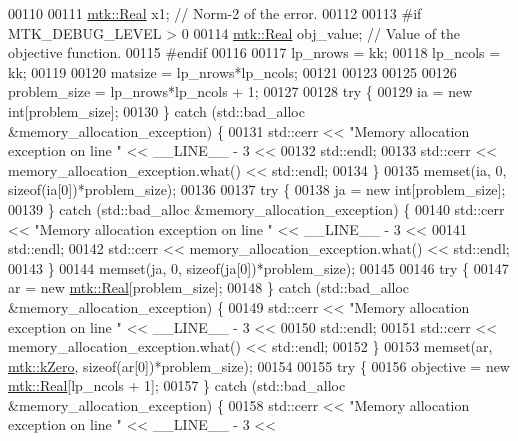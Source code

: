 \begin{DoxyCode}
00110 
00111   \hyperlink{group__c01-roots_gac080bbbf5cbb5502c9f00405f894857d}{mtk::Real} x1;             \textcolor{comment}{// Norm-2 of the error.}
00112 
00113 \textcolor{preprocessor}{  #if MTK\_DEBUG\_LEVEL > 0}
00114   \hyperlink{group__c01-roots_gac080bbbf5cbb5502c9f00405f894857d}{mtk::Real} obj\_value;      \textcolor{comment}{// Value of the objective function.}
00115 \textcolor{preprocessor}{  #endif}
00116 
00117   lp\_nrows = kk;
00118   lp\_ncols = kk;
00119 
00120   matsize = lp\_nrows*lp\_ncols;
00121 
00123 
00125 
00126   problem\_size = lp\_nrows*lp\_ncols + 1;
00127 
00128   \textcolor{keywordflow}{try} \{
00129     ia = \textcolor{keyword}{new} \textcolor{keywordtype}{int}[problem\_size];
00130   \} \textcolor{keywordflow}{catch} (std::bad\_alloc &memory\_allocation\_exception) \{
00131     std::cerr << \textcolor{stringliteral}{"Memory allocation exception on line "} << \_\_LINE\_\_ - 3 <<
00132       std::endl;
00133     std::cerr << memory\_allocation\_exception.what() << std::endl;
00134   \}
00135   memset(ia, 0, \textcolor{keyword}{sizeof}(ia[0])*problem\_size);
00136 
00137   \textcolor{keywordflow}{try} \{
00138     ja = \textcolor{keyword}{new} \textcolor{keywordtype}{int}[problem\_size];
00139   \} \textcolor{keywordflow}{catch} (std::bad\_alloc &memory\_allocation\_exception) \{
00140     std::cerr << \textcolor{stringliteral}{"Memory allocation exception on line "} << \_\_LINE\_\_ - 3 <<
00141       std::endl;
00142     std::cerr << memory\_allocation\_exception.what() << std::endl;
00143   \}
00144   memset(ja, 0, \textcolor{keyword}{sizeof}(ja[0])*problem\_size);
00145 
00146   \textcolor{keywordflow}{try} \{
00147     ar = \textcolor{keyword}{new} \hyperlink{group__c01-roots_gac080bbbf5cbb5502c9f00405f894857d}{mtk::Real}[problem\_size];
00148   \} \textcolor{keywordflow}{catch} (std::bad\_alloc &memory\_allocation\_exception) \{
00149     std::cerr << \textcolor{stringliteral}{"Memory allocation exception on line "} << \_\_LINE\_\_ - 3 <<
00150       std::endl;
00151     std::cerr << memory\_allocation\_exception.what() << std::endl;
00152   \}
00153   memset(ar, \hyperlink{group__c01-roots_ga59a451a5fae30d59649bcda274fea271}{mtk::kZero}, \textcolor{keyword}{sizeof}(ar[0])*problem\_size);
00154 
00155   \textcolor{keywordflow}{try} \{
00156     objective = \textcolor{keyword}{new} \hyperlink{group__c01-roots_gac080bbbf5cbb5502c9f00405f894857d}{mtk::Real}[lp\_ncols + 1];
00157   \} \textcolor{keywordflow}{catch} (std::bad\_alloc &memory\_allocation\_exception) \{
00158     std::cerr << \textcolor{stringliteral}{"Memory allocation exception on line "} << \_\_LINE\_\_ - 3 <<

\end{DoxyCode}
